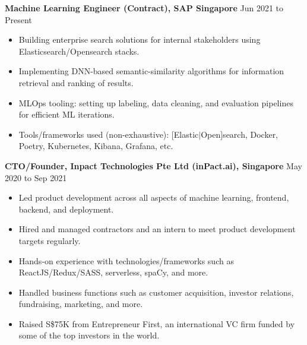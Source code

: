 \documentclass[10pt]{article}
\newenvironment{myinnerlist}[1][\enskip\textbullet]%
        {\begin{itemize}[#1,leftmargin=*,parsep=0pt,itemsep=3pt,topsep=0pt,partopsep=0pt]}
        {\end{itemize}\vspace{.6\baselineskip}}
\newcommand{\localtextbulletone}{\textcolor{gray}{\raisebox{.45ex}{\rule{.8ex}{.8ex}}}}
\begin{document}
{
    \hspace*{-\marginparsep minus \marginparwidth}%
    \begin{minipage}[t]{\textwidth+\marginparwidth+\marginparsep}%

        \textbf{Machine Learning Engineer (Contract), SAP Singapore} \hfill {Jun 2021 to Present}

        \vspace{0.1in}
        \begin{myinnerlist}
            \renewcommand{\labelitemi}{\localtextbulletone}

            \item Building enterprise search solutions for internal stakeholders using Elasticsearch/Opensearch stacks.
            \item Implementing DNN-based semantic-similarity algorithms for information retrieval and ranking of results.
            \item MLOps tooling: setting up labeling, data cleaning, and evaluation pipelines for efficient ML iterations.
            \item Tools/frameworks used (non-exhaustive): [Elastic$\vert$Open]search, Docker, Poetry, Kubernetes, Kibana, Grafana, etc.

        \end{myinnerlist}

        \textbf{CTO/Founder, Inpact Technologies Pte Ltd (inPact.ai), Singapore} \hfill {May 2020 to Sep 2021}

        \vspace{0.1in}
        \begin{myinnerlist}
            \renewcommand{\labelitemi}{\localtextbulletone}

            \item Led product development across all aspects of machine
                learning, frontend, backend, and deployment.

            \item Hired and managed contractors and an intern to meet product
                development targets regularly.

            \item Hands-on experience with technologies/frameworks such as
                ReactJS/Redux/SASS, serverless, spaCy, and more.

            \item Handled business functions such as customer acquisition,
                investor relations, fundraising,
                marketing, and more.
            \item Raised S\$75K from Entrepreneur First, an international VC
                firm funded by some of the top investors in the world.


\end{myinnerlist}
\end{minipage}}
\end{document}
